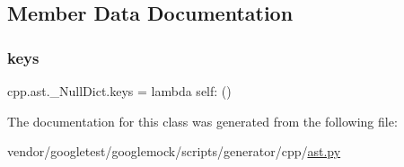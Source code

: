 \subsection{Member Data Documentation}
\mbox{\label{classcpp_1_1ast_1_1___null_dict_abb0b7884aa59bede0a8503dffcd1733f}} 
\subsubsection{\texorpdfstring{keys}{keys}}
{\footnotesize\ttfamily cpp.\+ast.\+\_\+\+Null\+Dict.\+keys = lambda self\+: ()\hspace{0.3cm}{\ttfamily [static]}}



The documentation for this class was generated from the following file\+:\begin{DoxyCompactItemize}
\item 
vendor/googletest/googlemock/scripts/generator/cpp/\hyperlink{ast_8py}{ast.\+py}\end{DoxyCompactItemize}
